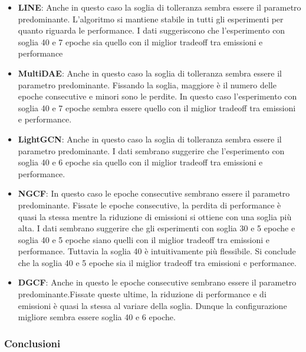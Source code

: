 \begin{itemize}
    \item \textbf{LINE}: Anche in questo caso la soglia di tolleranza sembra essere il parametro predominante. L'algoritmo si mantiene stabile in tutti gli esperimenti per quanto riguarda le performance. I dati suggeriscono che l'esperimento con soglia 40 e 7 epoche sia quello con il miglior tradeoff tra emissioni e performance
    \item \textbf{MultiDAE}: Anche in questo caso la soglia di tolleranza sembra essere il parametro predominante. Fissando la soglia, maggiore è il numero delle epoche consecutive e minori sono le perdite. In questo caso l'esperimento con soglia 40 e 7 epoche sembra essere quello con il miglior tradeoff tra emissioni e performance.
    \item \textbf{LightGCN}: Anche in questo caso la soglia di tolleranza sembra essere il parametro predominante. I dati sembrano suggerire che l'esperimento con soglia 40 e 6 epoche sia quello con il miglior tradeoff tra emissioni e performance.
    \item \textbf{NGCF}: In questo caso le epoche consecutive sembrano essere il parametro predominante. Fissate le epoche consecutive, la perdita di performance è quasi la stessa mentre la riduzione di emissioni si ottiene con una soglia più alta. I dati sembrano suggerire che gli esperimenti con soglia 30 e 5 epoche e soglia 40 e 5 epoche siano quelli con il miglior tradeoff tra emissioni e performance. Tuttavia la soglia 40 è intuitivamente più flessibile. Si conclude che la soglia 40 e 5 epoche sia il miglior tradeoff tra emissioni e performance.
    \item \textbf{DGCF}: Anche in questo le epoche consecutive sembrano essere il parametro predominante.Fissate queste ultime, la riduzione di performance e di emissioni è quasi la stessa al variare della soglia. Dunque la configurazione migliore sembra essere soglia 40 e 6 epoche.
\end{itemize}

\subsubsection{Conclusioni} 

\begin{table}[H]
    \centering
    \caption{Confronto tra i parametri del criterio}
    \end{table}

